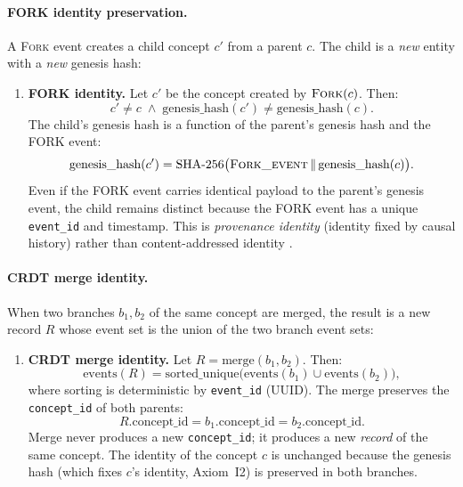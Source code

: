 \paragraph{FORK identity preservation.}
A \textsc{Fork} event creates a child concept $c'$ from a parent $c$. The child is a \emph{new} entity with a \emph{new} genesis hash:

\begin{enumerate}[label=Axiom I\arabic*:,leftmargin=3em,resume]
    \item \textbf{FORK identity.} Let $c'$ be the concept created by $\textsc{Fork}(c)$. Then:
    \begin{equation}\label{eq:i5}
        c' \neq c \;\land\; \text{genesis\_hash}(c') \neq \text{genesis\_hash}(c).
    \end{equation}
    The child's genesis hash is a function of the parent's genesis hash and the FORK event:
    \begin{equation}\label{eq:i5b}
        \text{genesis\_hash}(c') = \text{SHA-256}\bigl(\textsc{Fork\_event} \,\|\, \text{genesis\_hash}(c)\bigr).
    \end{equation}
    Even if the FORK event carries identical payload to the parent's genesis event, the child remains distinct because the FORK event has a unique \texttt{event\_id} and timestamp. This is \emph{provenance identity} (identity fixed by causal history) rather than content-addressed identity \cite{trusty_uris}.
\end{enumerate}

\paragraph{CRDT merge identity.}
When two branches $b_1, b_2$ of the same concept are merged, the result is a new record $R$ whose event set is the union of the two branch event sets:

\begin{enumerate}[label=Axiom I\arabic*:,leftmargin=3em,resume]
    \item \textbf{CRDT merge identity.} Let $R = \text{merge}(b_1, b_2)$. Then:
    \begin{equation}\label{eq:i6}
        \text{events}(R) = \text{sorted\_unique}\bigl(\text{events}(b_1) \cup \text{events}(b_2)\bigr),
    \end{equation}
    where sorting is deterministic by \texttt{event\_id} (UUID). The merge preserves the \texttt{concept\_id} of both parents:
    \begin{equation}\label{eq:i6b}
        R.\text{concept\_id} = b_1.\text{concept\_id} = b_2.\text{concept\_id}.
    \end{equation}
    Merge never produces a new \texttt{concept\_id}; it produces a new \emph{record} of the same concept. The identity of the concept $c$ is unchanged because the genesis hash (which fixes $c$'s identity, Axiom~I2) is preserved in both branches.
\end{enumerate}

